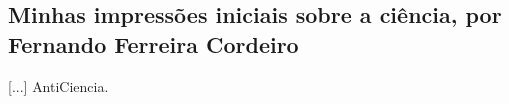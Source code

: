 \subsection{Minhas impressões iniciais sobre a ciência, por Fernando Ferreira Cordeiro}

[...] \gls{AntiCiencia}.

